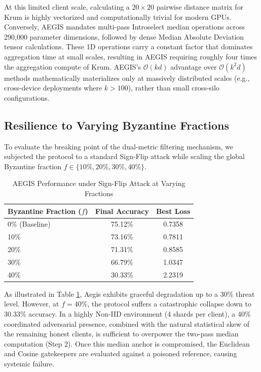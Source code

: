 \documentclass[10pt, conference]{IEEEtran}
\begin{document}
At this limited client scale, calculating a $20 \times 20$ pairwise distance matrix for Krum is highly vectorized and computationally trivial for modern GPUs. Conversely, AEGIS mandates multi-pass Introselect median operations across 290,000 parameter dimensions, followed by dense Median Absolute Deviation tensor calculations. These 1D operations carry a constant factor that dominates aggregation time at small scales, resulting in AEGIS requiring roughly four times the aggregation compute of Krum. AEGIS’s $\mathcal{O}(kd)$ advantage over $\mathcal{O}(k^2d)$ methods mathematically materializes only at massively distributed scales (e.g., cross-device deployments where $k > 100$), rather than small cross-silo configurations.

\subsection{Resilience to Varying Byzantine Fractions}
To evaluate the breaking point of the dual-metric filtering mechanism, we subjected the protocol to a standard Sign-Flip attack while scaling the global Byzantine fraction $f \in \{10\%, 20\%, 30\%, 40\%\}$.

\begin{table}[htbp]
\centering
\caption{AEGIS Performance under Sign-Flip Attack at Varying Fractions}
\begin{tabular}{@{}lcc@{}}
\toprule
\textbf{Byzantine Fraction ($f$)} & \textbf{Final Accuracy} & \textbf{Best Loss} \\ \midrule
0\% (Baseline) & 75.12\% & 0.7358 \\
10\% & 73.16\% & 0.7811 \\
20\% & 71.31\% & 0.8585 \\
30\% & 66.79\% & 1.0347 \\
40\% & 30.33\% & 2.2319 \\ \bottomrule
\end{tabular}
\label{tab:fractions}
\end{table}

As illustrated in Table \ref{tab:fractions}, Aegis exhibits graceful degradation up to a 30\% threat level. However, at $f=40\%$, the protocol suffers a catastrophic collapse down to 30.33\% accuracy. In a highly Non-IID environment (4 shards per client), a 40\% coordinated adversarial presence, combined with the natural statistical skew of the remaining honest clients, is sufficient to overpower the two-pass median computation (Step 2). Once this median anchor is compromised, the Euclidean and Cosine gatekeepers are evaluated against a poisoned reference, causing systemic failure.
\end{document}
